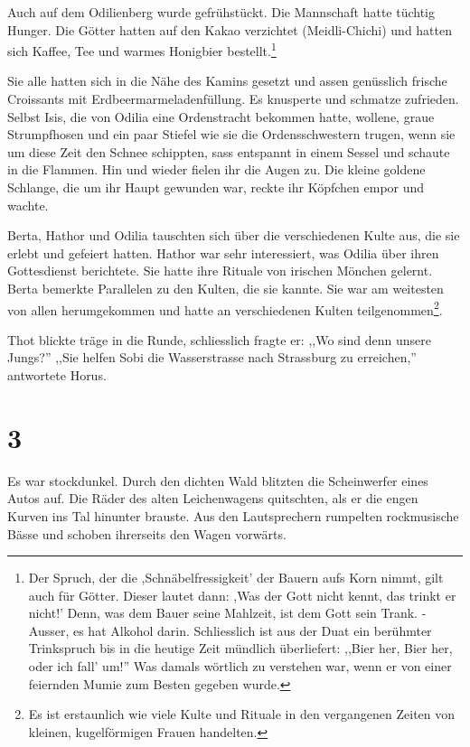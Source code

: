 \documentclass[11pt,titlepage,a5paper]{book}
\begin{document}
Auch auf dem Odilienberg wurde gefrühstückt. Die Mannschaft hatte tüchtig Hunger. Die Götter hatten auf den Kakao verzichtet (Meidli-Chichi) und hatten sich Kaffee, Tee und warmes Honigbier bestellt.\footnote{Der Spruch, der die ,Schnäbelfressigkeit' der Bauern aufs Korn nimmt, gilt auch für Götter. Dieser lautet dann: ,Was der Gott nicht kennt, das trinkt er nicht!' Denn, was dem Bauer seine Mahlzeit, ist dem Gott sein Trank. -Ausser, es hat Alkohol darin. Schliesslich ist aus der Duat ein berühmter Trinkspruch bis in die heutige Zeit mündlich überliefert: ,,Bier her, Bier her, oder ich fall' um!'' Was damals wörtlich zu verstehen war, wenn er von einer feiernden Mumie zum Besten gegeben wurde. } 

Sie alle hatten sich in die Nähe des Kamins gesetzt und assen genüsslich frische Croissants mit Erdbeermarmeladenfüllung. Es knusperte und schmatze zufrieden. Selbst Isis, die von Odilia eine Ordenstracht bekommen hatte, wollene, graue Strumpfhosen und ein paar Stiefel wie sie die Ordensschwestern trugen, wenn sie um diese Zeit den Schnee schippten, sass entspannt in einem Sessel und schaute in die Flammen. Hin und wieder fielen ihr die Augen zu. Die kleine goldene Schlange, die um ihr Haupt gewunden war, reckte ihr Köpfchen empor und wachte.

Berta, Hathor und Odilia tauschten sich über die verschiedenen Kulte aus, die sie erlebt und gefeiert hatten. Hathor war sehr interessiert, was Odilia über ihren Gottesdienst berichtete. Sie hatte ihre Rituale von irischen Mönchen gelernt. Berta bemerkte Parallelen zu den Kulten, die sie kannte. Sie war am weitesten von allen herumgekommen und hatte an verschiedenen Kulten teilgenommen\footnote{Es ist erstaunlich wie viele Kulte und Rituale in den vergangenen Zeiten von kleinen, kugelförmigen Frauen handelten.}. 

Thot blickte träge in die Runde, schliesslich fragte er: ,,Wo sind denn unsere Jungs?'' ,,Sie helfen Sobi die Wasserstrasse nach Strassburg zu erreichen,'' antwortete Horus.

\section*{3}

 Es war stockdunkel. Durch den dichten Wald blitzten die Scheinwerfer eines Autos auf. Die Räder des alten Leichenwagens quitschten, als er die engen Kurven ins Tal hinunter brauste. Aus den Lautsprechern rumpelten rockmusische Bässe und schoben ihrerseits den Wagen vorwärts. 
\end{document}
